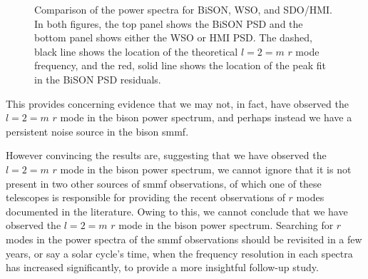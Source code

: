\begin{figure}[!ht]
	\centering
	\qquad
	\caption{Comparison of the power spectra for BiSON, WSO, and SDO/HMI. In both figures, the top panel shows the BiSON PSD and the bottom panel shows either the WSO or HMI PSD. The dashed, black line shows the location of the theoretical $l=2=m$ $r$ mode frequency, and the red, solid line shows the location of the peak fit in the BiSON PSD residuals.}  \label{fig:comparing_SMMF_PSDs}
\end{figure}

This provides concerning evidence that we may not, in fact, have observed the $l=2=m$ $r$ mode in the \gls{bison} power spectrum, and perhaps instead we have a persistent noise source in the \gls{bison} \gls{smmf}.

However convincing the results are, suggesting that we have observed the $l=2=m$ $r$ mode in the \gls{bison} power spectrum, we cannot ignore that it is not present in two other sources of \gls{smmf} observations, of which one of these telescopes is responsible for providing the recent observations of $r$ modes documented in the literature. Owing to this, we cannot conclude that we have observed the $l=2=m$ $r$ mode in the \gls{bison} power spectrum. Searching for $r$ modes in the power spectra of the \gls{smmf} observations should be revisited in a few years, or say a solar cycle's time, when the frequency resolution in each spectra has increased significantly, to provide a more insightful follow-up study.


